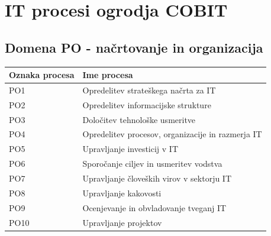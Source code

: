 \documentclass[a4paper,12pt]{report}
\begin{document}
\section{IT procesi ogrodja COBIT}
   \subsection{Domena PO - načrtovanje in organizacija}
      \begin{center}
         \begin{tabular}{|l|l|}
            \hline
            \textbf{Oznaka procesa} & \textbf{Ime procesa} \\
            \hline
            PO1 & Opredelitev strateškega načrta za IT \\
            PO2 & Opredelitev informacijske strukture \\
            PO3 & Določitev tehnološke usmeritve \\
            PO4 & Opredelitev procesov, organizacije in razmerja IT \\
            PO5 & Upravljanje investicij v IT \\
            PO6 & Sporočanje ciljev in usmeritev vodstva \\
            PO7 & Upravljanje človeških virov v sektorju IT \\
            PO8 & Upravljanje kakovosti \\
            PO9 & Ocenjevanje in obvladovanje tveganj IT \\
            PO10 & Upravljanje projektov \\
            \hline
         \end{tabular}
      \end{center}
\end{document}
